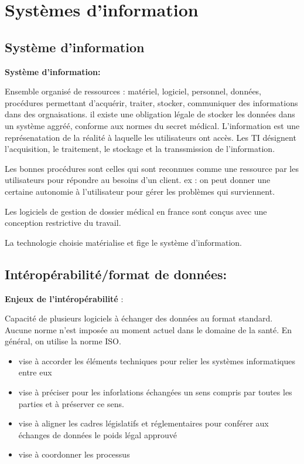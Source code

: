 \documentclass[12pt]{article}
\begin{document}
\tableofcontents
\pagebreak

\section {Systèmes d'information}
\subsection{Système d'information}
\textbf{Système d'information:} 

\begin{minipage}{0.8\textwidth}
Ensemble organisé de ressources : matériel, logiciel, personnel, données, procédures permettant d'acquérir, traiter, stocker,
communiquer des informations dans des orgnaisations.
il existe une obligation légale de stocker les données dans un système aggréé, conforme aux normes du secret médical.
L'information est une représenatation de la réalité à laquelle les utilisateurs ont accès.
Les TI désignent l'acquisition, le traitement, le stockage et la transsmission de l'information. \\
\end{minipage}

Les bonnes procédures sont celles qui sont reconnues comme une ressource par les utilisateurs pour répondre au besoins d'un client. ex : on peut donner une
certaine autonomie à l'utilisateur pour gérer les problèmes qui surviennent.

Les logiciels de gestion de dossier médical en france sont conçus avec une conception restrictive du travail. 

La technologie choisie matérialise et fige le système d'information.

\subsection {Intéropérabilité/format de données: }
\textbf{Enjeux de l'intéropérabilité} :

\begin{minipage}{0.8\textwidth}
Capacité de plusieurs logiciels à échanger des données au format standard. Aucune norme n'est imposée au moment actuel dans le domaine de la santé. En
général, on utilise la norme ISO.
\end{minipage}
\begin{itemize}
\item vise à accorder les éléments techniques pour relier les systèmes informatiques entre eux
\item vise à préciser pour les inforlations échangées un sens compris par toutes les parties et à préserver ce sens.
\item vise à aligner les cadres législatifs et réglementaires pour conférer aux échanges de données le poids légal approuvé
\item vise à coordonner les processus 
\end{itemize}
\end{document}
